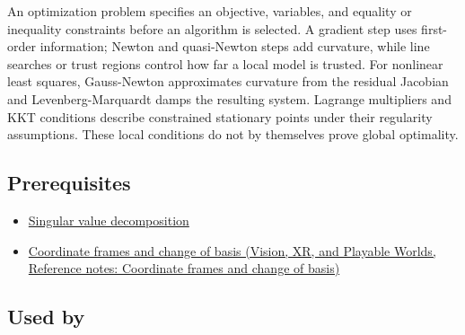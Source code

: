 An optimization problem specifies an objective, variables, and equality or inequality constraints before an algorithm is selected. A gradient step uses first-order information; Newton and quasi-Newton steps add curvature, while line searches or trust regions control how far a local model is trusted. For nonlinear least squares, Gauss-Newton approximates curvature from the residual Jacobian and Levenberg-Marquardt damps the resulting system. Lagrange multipliers and KKT conditions describe constrained stationary points under their regularity assumptions. These local conditions do not by themselves prove global optimality.

\subsection{Prerequisites}\label{appendix-29f4bea4c2bb-prerequisites}

\hypertarget{appendix-29f4bea4c2bb-prerequisites}{}

\begin{itemize}
\tightlist
\item
  \hyperref[appendix-1fad5e7f36fa]{Singular value decomposition}
\item
  \href{../07-Vision-XR-and-Playable-Worlds/main.pdf\#nameddest=appendix-1bae9457dbc3}{Coordinate frames and change of basis (Vision, XR, and Playable Worlds, Reference notes: Coordinate frames and change of basis)}
\end{itemize}

\subsection{Used by}\label{appendix-29f4bea4c2bb-used-by}

\hypertarget{appendix-29f4bea4c2bb-used-by}{}


